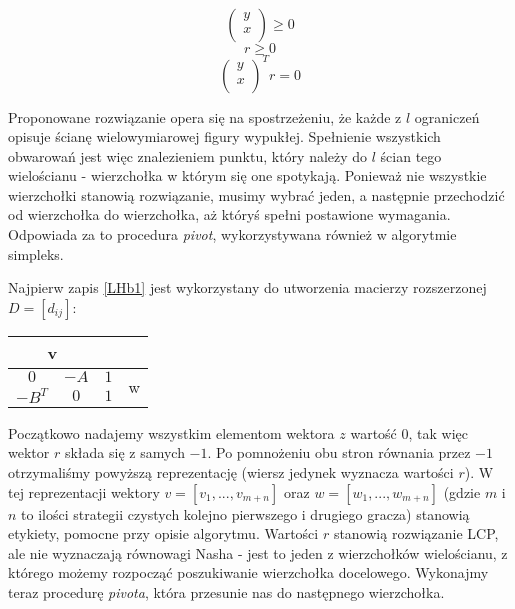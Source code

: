 \documentclass[polish]{standalone}
\begin{document}
\begin{equation}
\begin{pmatrix}
y \\
x \\
\end{pmatrix}
\geq 0 \label{LHb2}
\end{equation}
\begin{equation}
r \geq 0 \label{LHb3}
\end{equation}
\begin{equation}
\begin{pmatrix}
y \\
x \\
\end{pmatrix}^T
r
 = 0 \label{LHb4}
\end{equation}

Proponowane rozwiązanie opera się na spostrzeżeniu, że każde z $l$ ograniczeń opisuje ścianę wielowymiarowej figury
wypukłej. Spełnienie wszystkich obwarowań jest więc znalezieniem punktu, który należy do $l$ ścian tego wielościanu -
wierzchołka w którym się one spotykają. Ponieważ nie wszystkie wierzchołki stanowią rozwiązanie, musimy wybrać jeden, a
następnie przechodzić od wierzchołka do wierzchołka, aż któryś spełni postawione wymagania. Odpowiada za to procedura
\textit{pivot}, wykorzystywana również w algorytmie simpleks.

Najpierw zapis \ref{LHb1} jest wykorzystany do utworzenia macierzy rozszerzonej $D = [d_{ij}]$:
\begin{center}
\begin{tabular}[t]{ | c                       c      | c    | c                  }
                      \multicolumn{2}{|c|}{v}        &      &                    \\
\hline
                      $0$                     & $-A$ &  $1$ & \multirow{2}{*}{w} \\
                      $-B^T$                  & $0$  &  $1$ &                    \\
\hline
\end{tabular}
\end{center}
Początkowo nadajemy wszystkim elementom wektora $z$ wartość $0$, tak więc wektor $r$ składa się z samych $-1$. Po
pomnożeniu obu stron równania przez $-1$ otrzymaliśmy powyższą reprezentację (wiersz jedynek wyznacza wartości $r$).
W tej reprezentacji wektory $v = [ v_1, ..., v_{m+n} ]$ oraz $w = [ w_1, ..., w_{m+n} ]$ (gdzie $m$ i $n$ to ilości
strategii czystych kolejno pierwszego i drugiego gracza) stanowią etykiety, pomocne przy opisie algorytmu. Wartości $r$
stanowią rozwiązanie LCP, ale nie wyznaczają równowagi Nasha - jest to jeden z wierzchołków wielościanu, z którego
możemy rozpocząć poszukiwanie wierzchołka docelowego. Wykonajmy teraz procedurę \textit{pivota}, która przesunie nas
do następnego wierzchołka.
\end{document}
